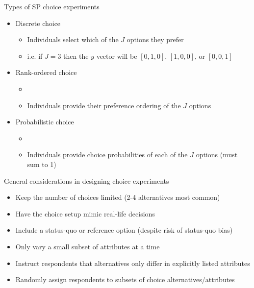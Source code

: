 \documentclass[aspectratio=169]{beamer}
\begin{document}
\begin{frame}

Types of SP choice experiments

\bigskip

\begin{itemize}
\itemsep1.5em
\item<2-> Discrete choice
\medskip\par
    \begin{itemize}
    \itemsep1.5em
    \item Individuals select which of the $J$ options they prefer
    \item i.e. if $J=3$ then the $y$ vector will be $[0,1,0]$, $[1,0,0]$, or $[0,0,1]$
    \end{itemize}
\item<3-> Rank-ordered choice
    \begin{itemize}
    \item[]
    \item Individuals provide their preference ordering of the $J$ options
    \end{itemize}
\item<4-> Probabilistic choice
    \begin{itemize}
    \item[]
    \item Individuals provide choice probabilities of each of the $J$ options (must sum to 1)
    \end{itemize}
\end{itemize}

\bigskip


\end{frame}

\begin{frame}

General considerations in designing choice experiments

\bigskip

\begin{itemize}
\itemsep1.5em
\item<2-> Keep the number of choices limited (2-4 alternatives most common)
\item<3-> Have the choice setup mimic real-life decisions
\item<4-> Include a status-quo or reference option (despite risk of status-quo bias)
\item<5-> Only vary a small subset of attributes at a time
\item<6-> Instruct respondents that alternatives only differ in explicitly listed attributes
\item<7-> Randomly assign respondents to subsets of choice alternatives/attributes
\end{itemize}

\end{frame}
\end{document}
